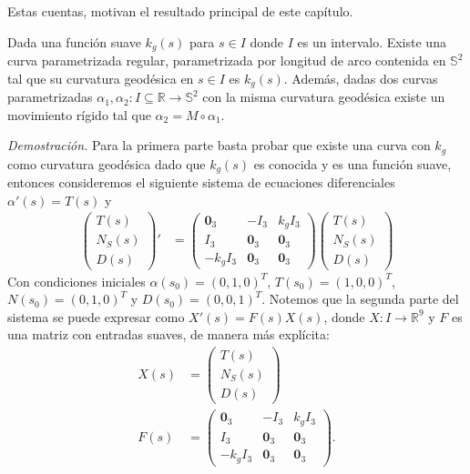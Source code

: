 \documentclass[oneside,11pt]{memoir}
\begin{document}
    Estas cuentas, motivan el resultado principal de este capítulo.
\begin{theorem}
    Dada una función suave $k_g(s)$ para $s\in I$ donde $I$ es un intervalo. Existe una curva parametrizada regular, parametrizada por longitud de arco contenida en $\mathbb{S}^2$ tal que su curvatura geodésica en $s\in I$ es $k_g(s)$. Además, dadas dos curvas parametrizadas $\alpha_1,\alpha_2: I\subseteq \mathbb{R}\to \mathbb{S}^2$ con la misma curvatura geodésica existe un movimiento rígido tal que $\alpha_2=M\circ \alpha_1$.
\end{theorem}
\textit{Demostración.} 
 Para la primera parte basta probar que existe una curva con $k_g$ como curvatura geodésica dado que $k_g(s)$ es conocida y es una función suave, entonces consideremos el siguiente sistema de ecuaciones diferenciales $   \alpha'(s)=T(s)$ y 
    \begin{align}
    \begin{pmatrix}
        T(s)\\
        N_S(s)\\
        D(s)
    \end{pmatrix}'
   & =
    \begin{pmatrix}
       \textbf{0}_3 & -I_3 & k_gI_3\\
       I_3 & \textbf{0}_3 & \textbf{0}_3\\
       -k_gI_3& \textbf{0}_3 & \textbf{0}_3
    \end{pmatrix}
    \begin{pmatrix}
        T(s)\\
        N_S(s)\\
        D(s)
    \end{pmatrix}
    \label{eq: sistemadarbouxmat}
    \end{align}
    Con condiciones iniciales $\alpha(s_0)=(0,1,0)^T$, $T(s_0)=(1,0,0)^T$, $N(s_0)=(0,1,0)^T$ y $D(s_0)=(0,0,1)^T$.
Notemos que la segunda parte del sistema se puede expresar como $X'(s)=F(s)X(s)$, donde $X:I\to \mathbb{R}^9$ y $F$ es una matriz con entradas suaves, de manera más explícita:
\begin{align*}
    X(s)&=\begin{pmatrix}
        T(s)\\
        N_S(s)\\
        D(s)
    \end{pmatrix}\\
    F(s)&=\begin{pmatrix}
       \textbf{0}_3 & -I_3 & k_gI_3\\
       I_3 & \textbf{0}_3 & \textbf{0}_3\\
       -k_gI_3& \textbf{0}_3 & \textbf{0}_3
    \end{pmatrix}
    .
\end{align*}
\end{document}
